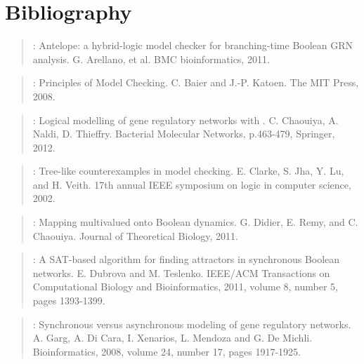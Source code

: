 \documentclass[letterpaper,10pt,english]{sphinxmanual}
\begin{document}
\chapter{Bibliography}
\label{\detokenize{Bibliography:bibliography}}\label{\detokenize{Bibliography::doc}}\label{\detokenize{Bibliography:arellano2011}}\begin{quote}

:
Antelope: a hybrid-logic model checker for branching-time Boolean GRN analysis.
G. Arellano, et al.
BMC bioinformatics, 2011.
\end{quote}
\label{\detokenize{Bibliography:baier2008}}\begin{quote}

:
Principles of Model Checking.
C. Baier and J.-P. Katoen.
The MIT Press, 2008.
\end{quote}
\label{\detokenize{Bibliography:chaouiya2012}}\begin{quote}

:
Logical modelling of gene regulatory networks with .
C. Chaouiya, A. Naldi, D. Thieffry.
Bacterial Molecular Networks, p.463-479, Springer, 2012.
\end{quote}
\label{\detokenize{Bibliography:clarke2002}}\begin{quote}

:
Tree-like counterexamples in model checking.
E. Clarke, S. Jha, Y. Lu, and H. Veith.
17th annual IEEE symposium on logic in computer science, 2002.
\end{quote}
\label{\detokenize{Bibliography:didier2011}}\begin{quote}

:
Mapping multivalued onto Boolean dynamics.
G. Didier, E. Remy, and C. Chaouiya.
Journal of Theoretical Biology, 2011.
\end{quote}
\label{\detokenize{Bibliography:dubrova2011}}\begin{quote}

:
A SAT-based algorithm for finding attractors in synchronous Boolean networks.
E. Dubrova and M. Teslenko.
IEEE/ACM Transactions on Computational Biology and Bioinformatics, 2011, volume 8, number 5, pages 1393-1399.
\end{quote}
\label{\detokenize{Bibliography:garg2008}}\begin{quote}

:
Synchronous versus asynchronous modeling of gene regulatory networks.
A. Garg, A. Di Cara, I. Xenarios, L. Mendoza and G. De Michli.
Bioinformatics, 2008, volume 24, number 17, pages 1917-1925.
\end{quote}
\end{document}
